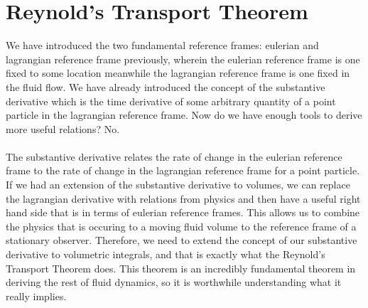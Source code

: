 \chapter{Reynold's Transport Theorem}

We have introduced the two fundamental reference frames: eulerian and lagrangian reference frame previously, wherein the eulerian reference frame is one fixed to some location meanwhile the lagrangian reference frame is one fixed in the fluid flow.
We have already introduced the concept of the substantive derivative which is the time derivative of some arbitrary quantity of a point particle in the lagrangian reference frame.
Now do we have enough tools to derive more useful relations? No.
\\~\\The substantive derivative relates the rate of change in the eulerian reference frame to the rate of change in the lagrangian reference frame for a point particle.
If we had an extension of the substantive derivative to volumes, we can replace the lagrangian derivative with relations from physics and then have a useful right hand side that is in terms of eulerian reference frames.
This allows us to combine the physics that is occuring to a moving fluid volume to the reference frame of a stationary observer.
Therefore, we need to extend the concept of our substantive derivative to volumetric integrals, and that is exactly what the Reynold's Transport Theorem does.
This theorem is an incredibly fundamental theorem in deriving the rest of fluid dynamics, so it is worthwhile understanding what it really implies.

